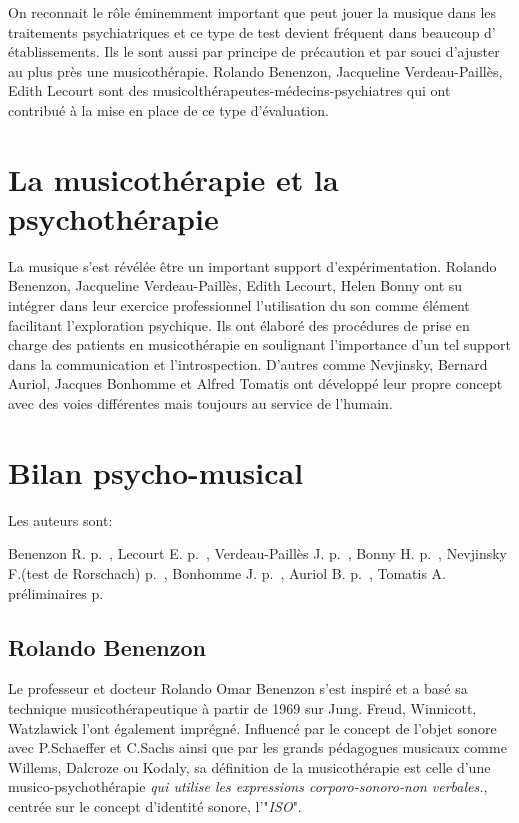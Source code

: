  
 On reconnait le rôle éminemment important que peut jouer la musique
 dans les traitements psychiatriques et ce type de test devient
 fréquent dans beaucoup d' établissements. Ils le sont aussi  par principe de précaution et
 par souci d'ajuster au plus près une
 musicothérapie. Rolando Benenzon, Jacqueline Verdeau-Paillès, Edith
 Lecourt sont des musicolthérapeutes-médecins-psychiatres qui ont contribué à la mise en place de ce
 type d'évaluation.

  
\section{La musicothérapie et la psychothérapie}
\label{musicothEtpsycho}

	 La musique s'est révélée  être un important support d'expérimentation.
	 Rolando Benenzon, Jacqueline Verdeau-Paillès, Edith
         Lecourt, Helen Bonny ont su intégrer dans leur exercice professionnel l'utilisation du son comme
          élément facilitant l'exploration psychique. 
	  Ils ont élaboré des procédures de prise en charge des patients en 
	  musicothérapie en soulignant  
	   l'importance d'un tel support dans la  communication et
           l'introspection.
           D'autres comme Nevjinsky, Bernard Auriol, Jacques Bonhomme
           et Alfred Tomatis ont développé leur propre concept avec
           des voies différentes mais toujours au service de l'humain. 

           \section{Bilan psycho-musical}

           Les auteurs sont:
           
           Benenzon R. p.\, \pageref{benenzon}, Lecourt E. p.\, \pageref{lecourt}, Verdeau-Paillès J. p.\, \pageref{verdeau-pailles:bilan}, Bonny
H. p.\, \pageref{gim_site} , Nevjinsky
F.(test de Rorschach) p.\, \pageref{anzieu.chabert:methodes}, Bonhomme J. p.\, \pageref{bonhomme}
, Auriol B. p.\, \pageref{auriol:son},
Tomatis A. préliminaires p.\, \pageref{tomatis_nous_1991} 
	  

  \subsection{Rolando Benenzon} 
	  
	  \label{benenzon}
	  Le professeur et docteur Rolando Omar Benenzon s'est inspiré et a basé sa technique 
	  musicothérapeutique à partir de 1969 
	  sur Jung.  Freud, Winnicott, Watzlawick l'ont également imprégné. 
	  Influencé par le concept de l'objet sonore  avec P.Schaeffer et C.Sachs 
	  ainsi que par les grands pédagogues musicaux comme Willems,
          Dalcroze ou Kodaly, sa définition de la musicothérapie est celle d'une musico-psychothérapie  
	  \emph{\textsl{qui utilise les expressions corporo-sonoro-non verbales.}}, 
	  centrée sur le concept d'identité sonore, l'"\textit{ISO}".

